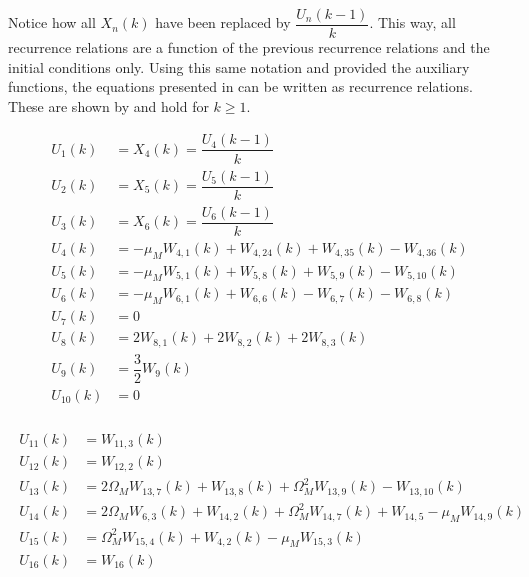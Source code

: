 Notice how all $X_{n}\left(k\right)$ have been replaced by $\dfrac{U_{n}\left(k-1\right)}{k}$. This way, all recurrence relations are a function of the previous recurrence relations and the initial conditions only. Using this same notation and provided the auxiliary functions, the equations presented in  can be written as recurrence relations. These are shown by  and hold for $k\geq 1$.

\begin{equation} \label{eq:allRecRel1}
\begin{split}
U_{1}\left(k\right)&=X_{4}\left(k\right)=\dfrac{U_{4}\left(k-1\right)}{k}\\
U_{2}\left(k\right)&=X_{5}\left(k\right)=\dfrac{U_{5}\left(k-1\right)}{k}\\
U_{3}\left(k\right)&=X_{6}\left(k\right)=\dfrac{U_{6}\left(k-1\right)}{k} \\
U_{4}\left(k\right)&=-\mu_{M}W_{4,1}\left(k\right)+W_{4,24}\left(k\right)+W_{4,35}\left(k\right)-W_{4,36}\left(k\right)\\
U_{5}\left(k\right)&=-\mu_{M}W_{5,1}\left(k\right)+W_{5,8}\left(k\right)+W_{5,9}\left(k\right)-W_{5,10}\left(k\right)\\
U_{6}\left(k\right)&=-\mu_{M}W_{6,1}\left(k\right)+W_{6,6}\left(k\right)-W_{6,7}\left(k\right)-W_{6,8}\left(k\right)\\
U_{7} \left(k\right)&=0 \\
U_{8}\left(k\right)&=2W_{8,1}\left(k\right)+2W_{8,2}\left(k\right)+2W_{8,3}\left(k\right)\\
U_{9}\left(k\right)&=\dfrac{3}{2}W_{9}\left(k\right)\\
U_{10} \left(k\right)&= 0 \\
\end{split}
\end{equation}



\begin{align} \label{eq:allRecRel2}
\begin{split}
U_{11} \left(k\right)&= W_{11,3}\left(k\right) \\
U_{12} \left(k\right)&= W_{12,2}\left(k\right) \\
U_{13} \left(k\right)&= 2\Omega_{M}W_{13,7}\left(k\right)+W_{13,8}\left(k\right)+\Omega_{M}^{2}W_{13,9}\left(k\right)-W_{13,10}\left(k\right) \\
U_{14} \left(k\right)&= 2\Omega_{M}W_{6,3}\left(k\right)+W_{14,2}\left(k\right)+\Omega_{M}^{2}W_{14,7}\left(k\right)+W_{14,5}-\mu_{M}W_{14,9}\left(k\right) \\
U_{15} \left(k\right)&= \Omega_{M}^{2}W_{15,4}\left(k\right)+W_{4,2}\left(k\right)-\mu_{M}W_{15,3}\left(k\right) \\
U_{16} \left(k\right)&= W_{16}\left(k\right) \\
\end{split}
\end{align}

